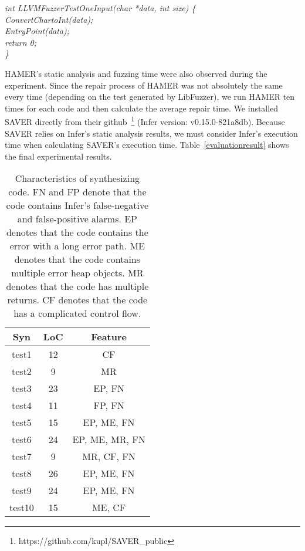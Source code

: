 \documentclass[a4paper,11pt,oneside,openany]{book}
\begin{document}
\begin{minipage}{\textwidth}
    \vspace{0.2cm}
    \textsl{\hspace{0.3cm}int LLVMFuzzerTestOneInput(char *data, int size) \{\\\hspace{0.6cm}ConvertChartoInt(data);\\\hspace{0.6cm}EntryPoint(data);\\\hspace{0.6cm}return 0;\\\hspace{0.3cm}\}}
    \vspace{0.2cm}
\end{minipage}
HAMER's static analysis and fuzzing time were also observed during the experiment. Since the repair process of HAMER was not absolutely the same every time (depending on the test generated by LibFuzzer), we run HAMER ten times for each code and then calculate the average repair time. We installed SAVER directly from their github~\footnote{https://github.com/kupl/SAVER\_public} (Infer version: v0.15.0-821a8db). Because SAVER relies on Infer's static analysis results, we must consider Infer's execution time when calculating SAVER's execution time. Table~\ref{evaluationresult} shows the final experimental results.



\begin{table}[h]
  \caption[Characteristics of synthesizing code]{Characteristics of synthesizing code. FN and FP denote that the code contains Infer's false-negative and false-positive alarms. EP denotes that the code contains the error with a long error path. ME denotes that the code contains multiple error heap objects. MR denotes that the code has multiple returns. CF denotes that the code has a complicated control flow.}
  \label{syncode}
  \centering
  \begin{tabular}{ccc}
   Syn & LoC  &  Feature \\
    \hline
    test1     & 12  &  CF \\
    test2     & 9   &  MR \\
    test3     & 23  &  EP, FN \\
    test4      & 11 &  FP, FN \\
    test5      & 15 &  EP, ME, FN \\
    test6      & 24 &  EP, ME, MR, FN \\
    test7      & 9   &  MR, CF, FN \\
    test8      & 26 &  EP, ME, FN \\
    test9     & 24  &  EP, ME, FN \\
    test10   & 15  &  ME, CF \\
    \hline
  \end{tabular}
\end{table}
\end{document}
